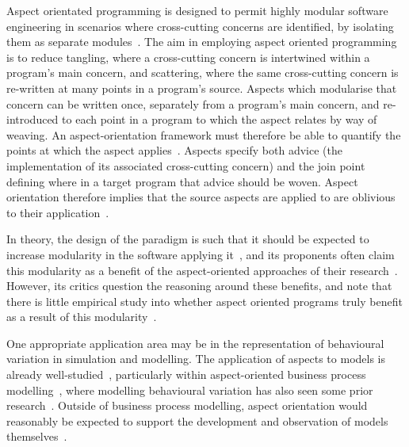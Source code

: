 Aspect orientated programming is designed to permit highly modular software
engineering in scenarios where cross-cutting concerns are identified, by
isolating them as separate modules~\cite{kiczales1997aspect}. The aim in
employing aspect oriented programming is to reduce tangling, where a
cross-cutting concern is intertwined within a program's main concern, and
scattering, where the same cross-cutting concern is re-written at many points in
a program's source. Aspects which modularise that concern can be written once,
separately from a program's main concern, and re-introduced to each point in a
program to which the aspect relates by way of weaving. An aspect-orientation
framework must therefore be able to quantify the points at which the aspect
applies~\cite{filman2000aspect}. Aspects specify both advice (the implementation
of its associated cross-cutting concern) and the join point defining where in a
target program that advice should be woven. Aspect orientation therefore implies
that the source aspects are applied to are oblivious to their
application~\cite{filman2000aspect}.

In theory, the design of the paradigm is such that it should be expected to
increase modularity in the software applying
it~\cite{kiczales1997aspect,filman2000aspect}, and its
proponents often claim this modularity as a benefit of the aspect-oriented
approaches of their
research~\cite{gilani2004family,charfi2007ao4bpel,Cappelli_AOBPM,jalali2012aspect,chibani2013toward}.
However, its critics question the reasoning around these benefits, and note that
there is little empirical study into whether aspect oriented programs truly
benefit as a result of this
modularity~\cite{Constantinides04aopconsidered,steimann06paradoxical,przybylek2010wrong}.

One appropriate application area may be in the representation of behavioural
variation in simulation and modelling. The application of aspects to models is
already well-studied~\cite{DEVSaspectorientation2008aksu,chibani2013toward},
particularly within aspect-oriented business process
modelling~\cite{charfi2007ao4bpel,Cappelli_AOBPM,jalali2012aspect}, where
modelling behavioural variation has also seen some prior
research~\cite{Machado_2011,stocker2013secsy,pourmasoumi2015business,ExecutableBPMNMitsyuk}. 
Outside of business process modelling, aspect orientation would reasonably be
expected to support the development and observation of models
themselves~\cite{gulyas1999use}. 

